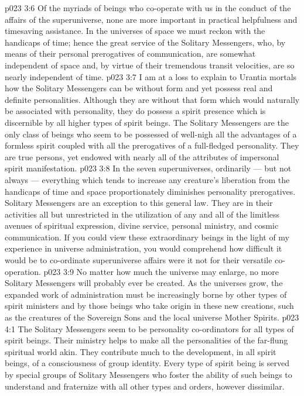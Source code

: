 \vs p023 3:6 Of the myriads of beings who co\hyp{}operate with us in the conduct of the affairs of the superuniverse, none are more important in practical helpfulness and timesaving assistance. In the universes of space we must reckon with the handicaps of time; hence the great service of the Solitary Messengers, who, by means of their personal prerogatives of communication, are somewhat independent of space and, by virtue of their tremendous transit velocities, are so nearly independent of time.
\vs p023 3:7 \pc I am at a loss to explain to Urantia mortals how the Solitary Messengers can be without form and yet possess real and definite personalities. Although they are without that form which would naturally be associated with personality, they do possess a spirit presence which is discernible by all higher types of spirit beings. The Solitary Messengers are the only class of beings who seem to be possessed of well\hyp{}nigh all the advantages of a formless spirit coupled with all the prerogatives of a full\hyp{}fledged personality. They are true persons, yet endowed with nearly all of the attributes of impersonal spirit manifestation.
\vs p023 3:8 In the seven superuniverses, ordinarily --- but not always --- everything which tends to increase any creature’s liberation from the handicaps of time and space proportionately diminishes personality prerogatives. Solitary Messengers are an exception to this general law. They are in their activities all but unrestricted in the utilization of any and all of the limitless avenues of spiritual expression, divine service, personal ministry, and cosmic communication. If you could view these extraordinary beings in the light of my experience in universe administration, you would comprehend how difficult it would be to co\hyp{}ordinate superuniverse affairs were it not for their versatile co\hyp{}operation.
\vs p023 3:9 No matter how much the universe may enlarge, no more Solitary Messengers will probably ever be created. As the universes grow, the expanded work of administration must be increasingly borne by other types of spirit ministers and by those beings who take origin in these new creations, such as the creatures of the Sovereign Sons and the local universe Mother Spirits.
\vs p023 4:1 The Solitary Messengers seem to be personality co\hyp{}ordinators for all types of spirit beings. Their ministry helps to make all the personalities of the far\hyp{}flung spiritual world akin. They contribute much to the development, in all spirit beings, of a consciousness of group identity. Every type of spirit being is served by special groups of Solitary Messengers who foster the ability of such beings to understand and fraternize with all other types and orders, however dissimilar.
